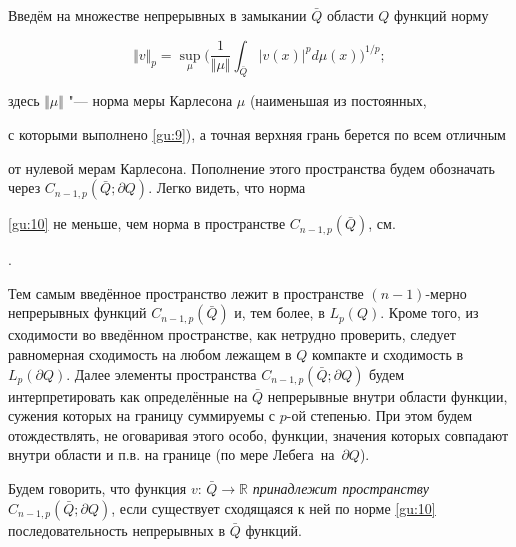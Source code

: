 \smallskip




Введём на множестве непрерывных в замыкании $\bar {Q} $ области $Q$ функций норму

\begin{equation}

\Vert v \Vert_p = \sup\limits_\mu \biggl(\frac{1}{\Vert\mu\Vert} \int_{\bar {Q}}  |v(x)|^p d\mu (x) \biggr)^{1/p}; 

\label{gu:10}

\end{equation}

здесь $\Vert\mu\Vert$ "--- норма меры Карлесона $\mu$ (наименьшая из постоянных,

с которыми выполнено \eqref{gu:9}), а точная верхняя грань берется по всем отличным

от нулевой мерам Карлесона. Пополнение этого пространства будем обозначать через $C_{n-1,p}(\bar {Q} ; \partial Q)$. Легко видеть, что норма

\eqref{gu:10} не меньше, чем норма в пространстве $C_{n-1,p}(\bar {Q})$, см.

\cite{G88}. 

Тем самым введённое пространство лежит в пространстве $(n-1)$-мерно непрерывных функций $C_{n-1,p}(\bar {Q})$ и, тем более, в $L_p(Q)$. Кроме того, из сходимости во введённом пространстве, как нетрудно проверить, следует равномерная сходимость на любом лежащем в $Q$ компакте и сходимость в $L_p(\partial Q)$. Далее элементы пространства $C_{n-1,p}(\bar {Q} ; \partial Q)$ будем интерпретировать как определённые на $\bar {Q} $ непрерывные внутри области функции, сужения которых на границу суммируемы с $p$-ой степенью. При этом будем отождествлять, не оговаривая этого особо, функции, значения которых совпадают внутри области и п.в. на границе (по мере Лебега~на~$\partial Q$).  



\smallskip



\begin{definition}[1]Будем говорить, что функция $v: \, \bar {Q} \to 

{\mathbb R}$ {\it принадлежит пространству} $C_{n-1,p}(\bar {Q} ; \partial Q)$, если существует сходящаяся к ней по норме \eqref{gu:10} последовательность непрерывных в $\bar {Q} $ функций.

\end{definition} 



